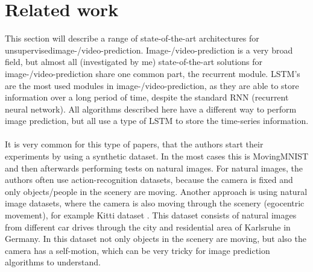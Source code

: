 \section{Related work} \label{section::related}
 This section will describe a range of state-of-the-art architectures for \glqq unsupervised\grqq image-/video-prediction. Image-/video-prediction is a very broad 
 field, but almost all (investigated by me) state-of-the-art solutions
 for image-/video-prediction share one common part, the recurrent module. LSTM's are the most used modules in image-/video-prediction, as they are able to store information over a long period of time, despite
 the standard RNN (recurrent neural network). All algorithms described here have a different way to perform image prediction, but all use a type of LSTM to store the time-series information.
 \\\\
 It is very common for this type of papers, that the authors start their experiments by using a synthetic dataset. In the most cases this is MovingMNIST \cite{LeCun1998} and then afterwards performing
 tests on natural images. For natural images, the authors often use action-recognition datasets, because the camera is fixed and only objects/people in the scenery are moving. Another approach
 is using natural image datasets, where the camera is also moving through the scenery (egocentric movement), for example Kitti dataset \cite{Geiger2013}.
 This dataset consists of natural images from different car drives through the city and residential area of Karlsruhe in Germany.
 In this dataset not only objects in the scenery are moving, but also the camera has a self-motion, which can be very tricky for image prediction algorithms to 
 \glqq understand\grqq.
 
